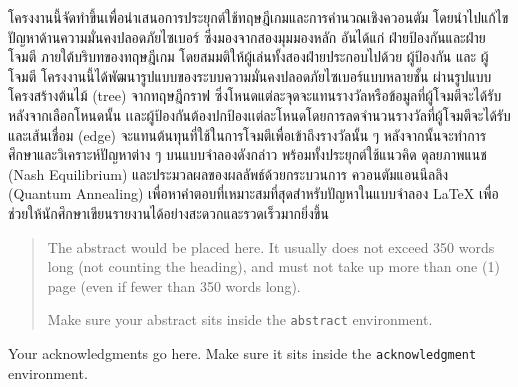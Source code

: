 \maketitle
\makesignature

\ifproject
\begin{abstractTH}

โครงงานนี้จัดทำขึ้นเพื่อนำเสนอการประยุกต์ใช้ทฤษฎีเกมและการคำนวณเชิงควอนตัม โดยนำไปแก้ไขปัญหาด้านความมั่นคงปลอดภัยไซเบอร์ ซึ่งมองจากสองมุมมองหลัก อันได้แก่ ฝ่ายป้องกันและฝ่ายโจมตี ภายใต้บริบทของทฤษฎีเกม โดยสมมติให้ผู้เล่นทั้งสองฝ่ายประกอบไปด้วย ผู้ป้องกัน และ ผู้โจมตี 
โครงงานนี้ได้พัฒนารูปแบบของระบบความมั่นคงปลอดภัยไซเบอร์แบบหลายชั้น ผ่านรูปแบบโครงสร้างต้นไม้ (tree) จากทฤษฎีกราฟ ซึ่งโหนดแต่ละจุดจะแทนรางวัลหรือข้อมูลที่ผู้โจมตีจะได้รับหลังจากเลือกโหนดนั้น เเละผู้ป้องกันต้องปกป้องเเต่ละโหนดโดยการลดจำนวนรางวัลที่ผู้โจมตีจะได้รับ และเส้นเชื่อม (edge) จะแทนต้นทุนที่ใช้ในการโจมตีเพื่อเข้าถึงรางวัลนั้น ๆ หลังจากนั้นจะทำการศึกษาและวิเคราะห์ปัญหาต่าง ๆ บนแบบจำลองดังกล่าว พร้อมทั้งประยุกต์ใช้แนวคิด ดุลยภาพแนช (Nash Equilibrium) และประมวลผลของผลลัพธ์ด้วยกระบวนการ ควอนตัมแอนนีลลิง (Quantum Annealing) เพื่อหาคำตอบที่เหมาะสมที่สุดสำหรับปัญหาในแบบจำลอง
\LaTeX{} เพื่อช่วยให้นักศึกษาเขียนรายงานได้อย่างสะดวกและรวดเร็วมากยิ่งขึ้น
\end{abstractTH}

\begin{abstract}
The abstract would be placed here. It usually does not exceed 350 words
long (not counting the heading), and must not take up more than one (1) page
(even if fewer than 350 words long).

Make sure your abstract sits inside the \texttt{abstract} environment.
\end{abstract}

\iffalse
\begin{dedication}
This document is dedicated to all Chiang Mai University students.

Dedication page is optional.
\end{dedication}
\fi %

\begin{acknowledgments}
Your acknowledgments go here. Make sure it sits inside the
\texttt{acknowledgment} environment.

\end{acknowledgments}%
\fi %

\contentspage

\ifproject
\figurelistpage

\tablelistpage
\fi %



